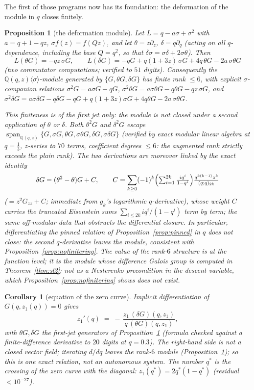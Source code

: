 \documentclass[11pt]{article}
\theoremstyle{plain}
\newtheorem{corollary}[theorem]{Corollary}
\newtheorem{proposition}[theorem]{Proposition}
\theoremstyle{definition}
\theoremstyle{remark}
\newcommand{\Q}{\mathbb{Q}}
\begin{document}
The first of those programs now has its foundation: the deformation of the module in $q$ closes
finitely.

\begin{proposition}[the deformation module]
\label{prop:deformation}
Let $L=q-a\sigma+\sigma^2$ with $a=q+1-qz$, $\sigma f(z)=f(Qz)$, and let $\theta=z\partial_z$,
$\delta=q\partial_q$ (acting on all $q$-dependence, including the base $Q=q^2$, so that
$\delta\sigma=\sigma\delta+2\sigma\theta$). Then
\[
   L(\theta G)=-qz\,\sigma G,
   \qquad
   L(\delta G)=-qG+q(1+3z)\,\sigma G+4q\,\theta G-2a\,\sigma\theta G
\]
(two commutator computations; verified to $51$ digits). Consequently the
$\Q(q,z)\langle\sigma\rangle$-module generated by $\{G,\theta G,\delta G\}$ has finite rank $\le6$,
with explicit $\sigma$-companion relations $\sigma^2G=a\sigma G-qG$,
$\sigma^2\theta G=a\sigma\theta G-q\theta G-qz\,\sigma G$, and
$\sigma^2\delta G=a\sigma\delta G-q\delta G-qG+q(1+3z)\sigma G+4q\theta G-2a\,\sigma\theta G$.

This finiteness is of the \emph{first jet only}: the module is \emph{not} closed under a second
application of $\theta$ or $\delta$. Both $\theta^2G$ and $\delta^2G$ escape
$\operatorname{span}_{\Q(q,z)}\{G,\sigma G,\theta G,\sigma\theta G,\delta G,\sigma\delta G\}$
(verified by exact modular linear algebra at $q=\tfrac13$, $z$-series to $70$ terms, coefficient
degrees $\le6$: the augmented rank strictly exceeds the plain rank). The two derivations are moreover
linked by the exact identity
\[
   \delta G=(\theta^2-\theta)G+C,\qquad
   C=\sum_{k\ge0}(-1)^k\Bigl(\textstyle\sum_{i=1}^{2k}\tfrac{iq^i}{1-q^i}\Bigr)
   \frac{q^{k(k-1)}z^k}{(q;q)_{2k}}
\]
($=z^2G_{zz}+C$; immediate from $g_k$'s logarithmic $q$-derivative), whose weight $C$ carries the
truncated Eisenstein sums $\sum_{i\le2k}iq^i/(1-q^i)$ term by term; the same off-modular data that
obstructs the differential closure. In particular, differentiating the pinned relation of
Proposition~\ref{prop:pinned} in $q$ does \emph{not} close: the second $q$-derivative leaves the
module, consistent with Proposition~\ref{prop:nofinitering}. The value of the rank-$6$ structure is at
the \emph{function} level; it is the module whose difference Galois group is computed in
Theorem~\ref{thm:sl2}; not as a Nesterenko precondition in the descent variable, which
Proposition~\ref{prop:nofinitering} shows does not exist.
\end{proposition}

\begin{corollary}[equation of the zero curve]
\label{cor:zerocurve}
Implicit differentiation of $G(q,z_1(q))=0$ gives
\[
   z_1'(q)\;=\;-\,\frac{z_1\,(\delta G)(q,z_1)}{q\,(\theta G)(q,z_1)},
\]
with $\theta G,\delta G$ the first-jet generators of Proposition~\ref{prop:deformation} (formula
checked against a finite-difference derivative to $20$ digits at $q=0.3$). The right-hand side is not a
closed vector field; iterating $d/dq$ leaves the rank-$6$ module (Proposition~\ref{prop:deformation}); so this is one exact relation, not an autonomous system. The number $q^\ast$ is the crossing of the
zero curve with the diagonal: $z_1(q^\ast)=2q^\ast(1-q^\ast)$ (residual $<10^{-27}$).
\end{corollary}
\end{document}
